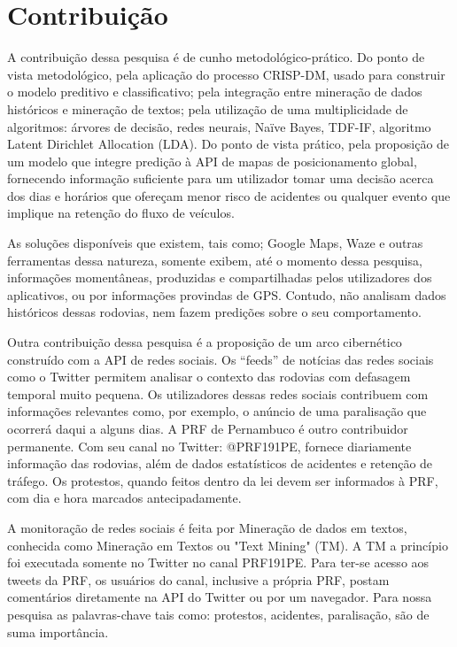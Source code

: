 \chapter{Contribuição}\label{meto}

A contribuição dessa pesquisa é de cunho metodológico-prático.
Do ponto de vista metodológico, pela aplicação do processo CRISP-DM, usado para construir o modelo preditivo e classificativo; pela integração entre mineração de dados históricos e mineração de textos; pela utilização de uma multiplicidade de algoritmos: árvores de decisão, redes neurais, Naïve Bayes, TDF-IF, algoritmo Latent Dirichlet Allocation (LDA). Do ponto de vista prático, pela proposição de um modelo que integre predição à API de mapas de posicionamento global, fornecendo informação suficiente para um utilizador tomar uma decisão acerca dos dias e horários que ofereçam menor risco de acidentes ou qualquer evento que implique na retenção do fluxo de veículos. 

As soluções disponíveis que existem, tais como; Google Maps, Waze e outras ferramentas dessa natureza, somente exibem, até o momento dessa pesquisa, informações momentâneas, produzidas e compartilhadas pelos utilizadores dos aplicativos, ou por informações provindas de GPS. Contudo, não analisam dados históricos dessas rodovias, nem fazem predições sobre o seu comportamento.

Outra contribuição dessa pesquisa é a proposição de um arco cibernético construído com a API de redes sociais.
Os ``feeds'' de notícias das redes sociais como o Twitter permitem analisar o contexto das rodovias com defasagem temporal muito pequena.
Os utilizadores dessas redes sociais contribuem com informações relevantes como, por exemplo, o anúncio de uma paralisação que ocorrerá 
daqui a alguns dias. A PRF de Pernambuco é outro contribuidor permanente. Com seu canal no Twitter: @PRF191PE, fornece diariamente informação das rodovias, 
além de dados estatísticos de acidentes e retenção de tráfego. Os protestos, quando feitos dentro da lei
devem ser informados à PRF, com dia e hora marcados antecipadamente.

A monitoração de redes sociais é feita por Mineração de dados em textos, conhecida como Mineração em Textos ou "Text Mining" (TM).
A TM a princípio foi executada somente no Twitter no canal PRF191PE. 
Para ter-se acesso aos tweets da PRF, os usuários do canal, inclusive a própria PRF, postam comentários diretamente 
na API do Twitter ou por um navegador. Para nossa pesquisa as palavras-chave tais como: protestos, acidentes, paralisação, são de suma importância.

